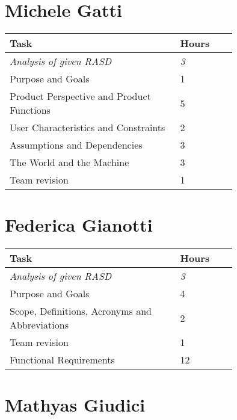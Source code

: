\section{Michele Gatti}

\smallskip
\begin{center}
\begin{tabular}{ | p{0.75\linewidth} | l | }
  \hline
    \textbf{Task} & \textbf{Hours }\\ \hline
    \textit{Analysis of given RASD} & \textit{3} \\ \hline
    Purpose and Goals & 1 \\ \hline
    Product Perspective and Product Functions & 5 \\ \hline
    User Characteristics and Constraints & 2 \\ \hline
    Assumptions and Dependencies & 3 \\ \hline
    The World and the Machine & 3 \\ \hline
    Team revision & 1 \\ \hline
\end{tabular}
\end{center}
\smallskip


\section{Federica Gianotti}

\smallskip
\begin{center}
\begin{tabular}{ | p{0.75\linewidth} | l | }
  \hline
    \textbf{Task} & \textbf{Hours }\\ \hline
    \textit{Analysis of given RASD} & \textit{3} \\ \hline
    Purpose and Goals & 4 \\ \hline
    Scope, Definitions, Acronyms and Abbreviations & 2 \\ \hline
    Team revision & 1 \\ \hline
    Functional Requirements & 12 \\ \hline
\end{tabular}
\end{center}
\smallskip

\section{Mathyas Giudici}

